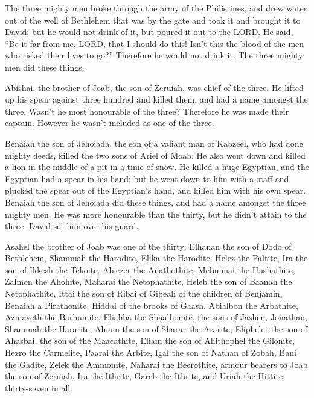  The three mighty men broke through the army of the
Philistines, and drew water out of the well of Bethlehem that was by the
gate and took it and brought it to David; but he would not drink of it,
but poured it out to the LORD.  He said, ``Be it far from
me, LORD, that I should do this! Isn't this the blood of the men who
risked their lives to go?'' Therefore he would not drink it. The three
mighty men did these things.

 Abishai, the brother of Joab, the son of Zeruiah, was
chief of the three. He lifted up his spear against three hundred and
killed them, and had a name amongst the three.  Wasn't he
most honourable of the three? Therefore he was made their captain.
However he wasn't included as one of the three.

 Benaiah the son of Jehoiada, the son of a valiant man of
Kabzeel, who had done mighty deeds, killed the two sons of Ariel of
Moab. He also went down and killed a lion in the middle of a pit in a
time of snow.  He killed a huge Egyptian, and the Egyptian
had a spear in his hand; but he went down to him with a staff and
plucked the spear out of the Egyptian's hand, and killed him with his
own spear.  Benaiah the son of Jehoiada did these things,
and had a name amongst the three mighty men.  He was more
honourable than the thirty, but he didn't attain to the three. David set
him over his guard.

 Asahel the brother of Joab was one of the thirty: Elhanan
the son of Dodo of Bethlehem,  Shammah the Harodite, Elika
the Harodite,  Helez the Paltite, Ira the son of Ikkesh the
Tekoite,  Abiezer the Anathothite, Mebunnai the Hushathite,
 Zalmon the Ahohite, Maharai the Netophathite,
 Heleb the son of Baanah the Netophathite, Ittai the son of
Ribai of Gibeah of the children of Benjamin,  Benaiah a
Pirathonite, Hiddai of the brooks of Gaash.  Abialbon the
Arbathite, Azmaveth the Barhumite,  Eliahba the
Shaalbonite, the sons of Jashen, Jonathan,  Shammah the
Hararite, Ahiam the son of Sharar the Ararite,  Eliphelet
the son of Ahasbai, the son of the Maacathite, Eliam the son of
Ahithophel the Gilonite,  Hezro the Carmelite, Paarai the
Arbite,  Igal the son of Nathan of Zobah, Bani the Gadite,
 Zelek the Ammonite, Naharai the Beerothite, armour bearers
to Joab the son of Zeruiah,  Ira the Ithrite, Gareb the
Ithrite,  and Uriah the Hittite: thirty-seven in all.

